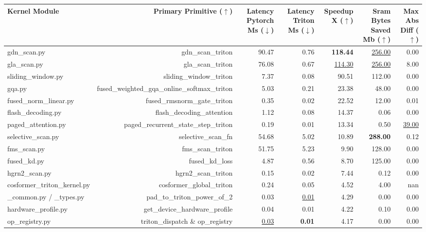 
\begin{table}[t]
\centering
\small
\setlength{\tabcolsep}{5pt}
\begin{tabular}{lrrrrrr}
\toprule
Kernel Module & Primary Primitive ($\uparrow$) & Latency Pytorch Ms ($\downarrow$) & Latency Triton Ms ($\downarrow$) & Speedup X ($\uparrow$) & Sram Bytes Saved Mb ($\uparrow$) & Max Abs Diff ($\uparrow$) \\
\midrule
gdn\_scan.py & gdn\_scan\_triton & 90.47 & 0.76 & \textbf{118.44} & \underline{256.00} & 0.00 \\
gla\_scan.py & gla\_scan\_triton & 76.08 & 0.67 & \underline{114.30} & \underline{256.00} & 8.00 \\
sliding\_window.py & sliding\_window\_triton & 7.37 & 0.08 & 90.51 & 112.00 & 0.00 \\
gqa.py & fused\_weighted\_gqa\_online\_softmax\_triton & 5.03 & 0.21 & 23.38 & 48.00 & 0.00 \\
fused\_norm\_linear.py & fused\_rmsnorm\_gate\_triton & 0.35 & 0.02 & 22.52 & 12.00 & 0.01 \\
flash\_decoding.py & flash\_decoding\_attention & 1.12 & 0.08 & 14.37 & 0.06 & 0.00 \\
paged\_attention.py & paged\_recurrent\_state\_step\_triton & 0.19 & 0.01 & 13.34 & 0.50 & \underline{39.00} \\
selective\_scan.py & selective\_scan\_fn & 54.68 & 5.02 & 10.89 & \textbf{288.00} & 0.12 \\
fms\_scan.py & fms\_scan\_triton & 51.75 & 5.23 & 9.90 & 128.00 & 0.00 \\
fused\_kd.py & fused\_kd\_loss & 4.87 & 0.56 & 8.70 & 125.00 & 0.00 \\
hgrn2\_scan.py & hgrn2\_scan\_triton & 0.15 & 0.02 & 7.44 & 0.12 & 0.00 \\
cosformer\_triton\_kernel.py & cosformer\_global\_triton & 0.24 & 0.05 & 4.52 & 4.00 & nan \\
\_common.py / \_types.py & pad\_to\_triton\_power\_of\_2 & 0.03 & \underline{0.01} & 4.29 & 0.00 & 0.00 \\
hardware\_profile.py & get\_device\_hardware\_profile & 0.04 & 0.01 & 4.22 & 0.10 & 0.00 \\
op\_registry.py & triton\_dispatch \& op\_registry & \underline{0.03} & \textbf{0.01} & 4.17 & 0.00 & 0.00 \\

\end{tabular}
\end{table}
